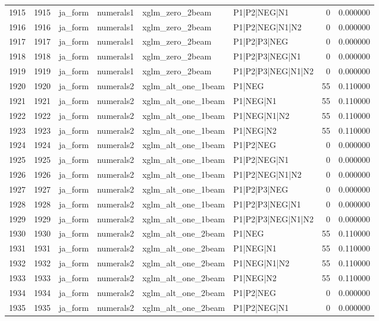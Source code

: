 \begin{tabular}{lrllllrr}
1915 & 1915 & ja_form & numerals1 & xglm_zero_2beam & P1|P2|NEG|N1 & 0 & 0.000000 \\
1916 & 1916 & ja_form & numerals1 & xglm_zero_2beam & P1|P2|NEG|N1|N2 & 0 & 0.000000 \\
1917 & 1917 & ja_form & numerals1 & xglm_zero_2beam & P1|P2|P3|NEG & 0 & 0.000000 \\
1918 & 1918 & ja_form & numerals1 & xglm_zero_2beam & P1|P2|P3|NEG|N1 & 0 & 0.000000 \\
1919 & 1919 & ja_form & numerals1 & xglm_zero_2beam & P1|P2|P3|NEG|N1|N2 & 0 & 0.000000 \\
1920 & 1920 & ja_form & numerals2 & xglm_alt_one_1beam & P1|NEG & 55 & 0.110000 \\
1921 & 1921 & ja_form & numerals2 & xglm_alt_one_1beam & P1|NEG|N1 & 55 & 0.110000 \\
1922 & 1922 & ja_form & numerals2 & xglm_alt_one_1beam & P1|NEG|N1|N2 & 55 & 0.110000 \\
1923 & 1923 & ja_form & numerals2 & xglm_alt_one_1beam & P1|NEG|N2 & 55 & 0.110000 \\
1924 & 1924 & ja_form & numerals2 & xglm_alt_one_1beam & P1|P2|NEG & 0 & 0.000000 \\
1925 & 1925 & ja_form & numerals2 & xglm_alt_one_1beam & P1|P2|NEG|N1 & 0 & 0.000000 \\
1926 & 1926 & ja_form & numerals2 & xglm_alt_one_1beam & P1|P2|NEG|N1|N2 & 0 & 0.000000 \\
1927 & 1927 & ja_form & numerals2 & xglm_alt_one_1beam & P1|P2|P3|NEG & 0 & 0.000000 \\
1928 & 1928 & ja_form & numerals2 & xglm_alt_one_1beam & P1|P2|P3|NEG|N1 & 0 & 0.000000 \\
1929 & 1929 & ja_form & numerals2 & xglm_alt_one_1beam & P1|P2|P3|NEG|N1|N2 & 0 & 0.000000 \\
1930 & 1930 & ja_form & numerals2 & xglm_alt_one_2beam & P1|NEG & 55 & 0.110000 \\
1931 & 1931 & ja_form & numerals2 & xglm_alt_one_2beam & P1|NEG|N1 & 55 & 0.110000 \\
1932 & 1932 & ja_form & numerals2 & xglm_alt_one_2beam & P1|NEG|N1|N2 & 55 & 0.110000 \\
1933 & 1933 & ja_form & numerals2 & xglm_alt_one_2beam & P1|NEG|N2 & 55 & 0.110000 \\
1934 & 1934 & ja_form & numerals2 & xglm_alt_one_2beam & P1|P2|NEG & 0 & 0.000000 \\
1935 & 1935 & ja_form & numerals2 & xglm_alt_one_2beam & P1|P2|NEG|N1 & 0 & 0.000000 \\

\end{tabular}
